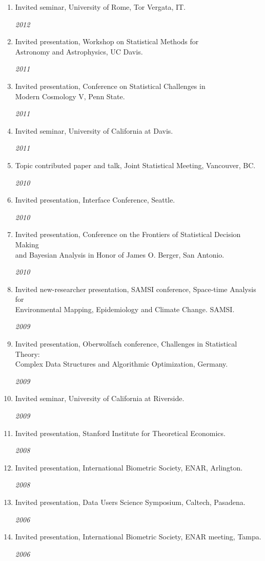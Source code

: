 \documentclass[11pt]{article}
\newcommand{\ddatedentry}[2]{
  {#1}
  \hfill
  \begin{minipage}{.5in}{\hfill\textit{#2}}\end{minipage}
  }
\begin{document}
\begin{enumerate}
\item
\ddatedentry{Invited seminar, University of Rome, Tor Vergata, IT.}{2012}

\item
\ddatedentry{Invited presentation, Workshop on Statistical Methods for \\
Astronomy and Astrophysics, UC Davis.}{2011}


\item
\ddatedentry{Invited presentation, Conference on Statistical Challenges in \\ Modern Cosmology V, Penn State.}{2011}


\item
\ddatedentry{Invited seminar, University of California at Davis.}{2011}

\item
\ddatedentry{Topic contributed paper and talk, Joint Statistical Meeting, Vancouver, BC.}{2010}

\item
\ddatedentry{Invited presentation, Interface Conference, Seattle.}{2010}


\item
\ddatedentry{Invited presentation, Conference on the Frontiers of Statistical Decision Making\\ and  Bayesian Analysis in Honor of James O. Berger, San Antonio.}{2010}


\item
\ddatedentry{Invited new-researcher presentation, SAMSI conference, Space-time Analysis for  \\ Environmental Mapping, Epidemiology and Climate Change. SAMSI.}{2009}

\item
\ddatedentry{Invited presentation, Oberwolfach conference, Challenges in Statistical Theory: \\Complex Data Structures and Algorithmic Optimization, Germany.}{2009}


\item
\ddatedentry{Invited seminar, University of California at Riverside.}{2009}

\item
\ddatedentry{Invited presentation, Stanford Institute for Theoretical Economics.}{2008}


\item
\ddatedentry{Invited  presentation, International Biometric Society, ENAR, Arlington.}{2008}

\item
\ddatedentry{Invited presentation, Data Users Science Symposium, Caltech, Pasadena.}{2006}

\item
\ddatedentry{Invited presentation, International Biometric Society, ENAR meeting, Tampa.}{2006}


\end{enumerate}
\end{document}
